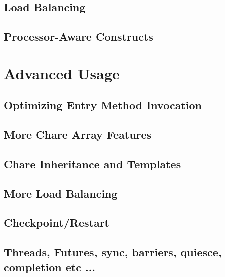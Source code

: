 \documentclass[10pt]{report}
\begin{document}
\chapter{Load Balancing}
  

\chapter{Processor-Aware Constructs}
  
  


\part{Advanced Usage}

\chapter{Optimizing Entry Method Invocation}
  
  
  

\chapter{More Chare Array Features}
\label{advanced arrays}
  

\chapter{Chare Inheritance and Templates}
\label{inheritance and templates}
  

\chapter{}
  
  
  
  

\chapter{More Load Balancing}
  

\chapter{Checkpoint/Restart}
\label{sec:checkpoint}
  

\chapter{Threads, Futures, sync, barriers, quiesce, completion etc ...}
  
  
\end{document}

